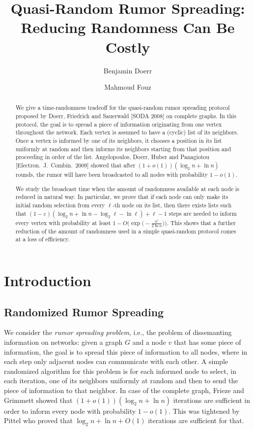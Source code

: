 \documentclass{article}
\title{Quasi-Random Rumor Spreading: Reducing Randomness Can Be Costly}
\author{Benjamin Doerr \and  Mahmoud Fouz}
\begin{document}
\maketitle











\begin{abstract}
We give a time-randomness tradeoff for the quasi-random rumor spreading protocol proposed by Doerr, Friedrich and Sauerwald [SODA 2008] on complete graphs. In this protocol, the goal is to spread a piece of information originating from one vertex throughout the network. Each vertex is assumed to have a (cyclic) list of its neighbors. Once a vertex is informed by one of its neighbors, it chooses a position in its list uniformly at random and then informs its neighbors starting from that position and proceeding in order of the list. Angelopoulos, Doerr, Huber and Panagiotou [Electron.~J.~Combin.~2009] showed that after $(1+o(1))(\log_2 n + \ln n)$ rounds, the rumor will have been broadcasted to all nodes with probability $1 - o(1)$. 

We study the broadcast time when the amount of randomness available at each node is reduced in natural way. In particular, we prove that if each node can only make its initial random selection from every $\ell$-th node on its list, then there exists lists such that $(1-\varepsilon) (\log_2 n + \ln n - \log_2 \ell - \ln \ell)+\ell-1$ steps are needed to inform every vertex with probability at least $1-O\bigl(\exp\bigl(-\frac{n^\varepsilon}{2\ln n}\bigr)\bigr)$. This shows that a further reduction of the amount of randomness used in a simple quasi-random protocol comes at a loss of efficiency.
\end{abstract}




\section{Introduction}

\subsection{Randomized Rumor Spreading}

We consider the \textit{rumor spreading problem}, i.e., the problem of dissemanting information on networks: given a graph $G$ and a node $v$ that has some piece of information, the goal is to spread this piece of information to all nodes, where in each step only adjacent nodes can communicate with each other. A simple randomized algorithm for this problem is for each informed node to select, in each iteration, one of its neighbors uniformly at random and then to send the piece of information to that neighbor. In case of the complete graph, Frieze and Grimmett \cite{FG85} showed that $(1+o(1)) (\log_2 n + \ln n)$ iterations are sufficient in order to inform every node with probability $1-o(1)$. This was tightened by Pittel \cite{Pi87} who proved that $\log_2 n + \ln n + O(1)$ iterations are sufficient for that. 
\end{document}
